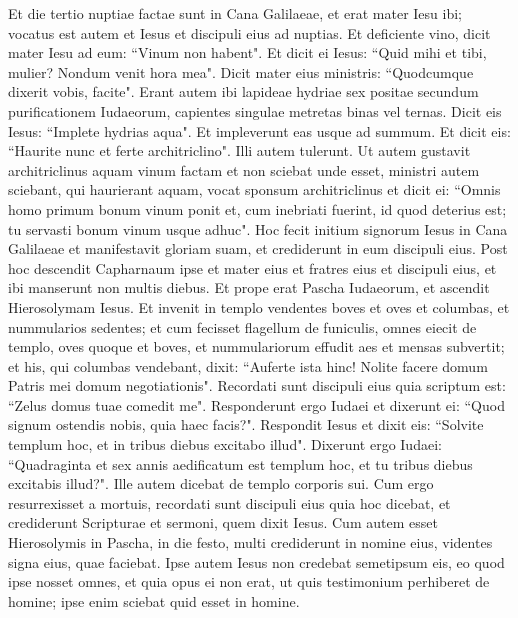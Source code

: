 \begin{biblechapter} 
\verse Et die tertio nuptiae factae sunt in Cana Galilaeae, et erat mater Iesu ibi; 
\verse vocatus est autem et Iesus et discipuli eius ad nuptias. 
\verse Et deficiente vino, dicit mater Iesu ad eum: “Vinum non habent". 
\verse Et dicit ei Iesus: “Quid mihi et tibi, mulier? Nondum venit hora mea". 
\verse Dicit mater eius ministris: “Quodcumque dixerit vobis, facite". 
\verse Erant autem ibi lapideae hydriae sex positae secundum purificationem Iudaeorum, capientes singulae metretas binas vel ternas. 
\verse Dicit eis Iesus: “Implete hydrias aqua". Et impleverunt eas usque ad summum. 
\verse Et dicit eis: “Haurite nunc et ferte architriclino". Illi autem tulerunt. 
\verse Ut autem gustavit architriclinus aquam vinum factam et non sciebat unde esset, ministri autem sciebant, qui haurierant aquam, vocat sponsum architriclinus  
\verse et dicit ei: “Omnis homo primum bonum vinum ponit et, cum inebriati fuerint, id quod deterius est; tu servasti bonum vinum usque adhuc". 
\verse Hoc fecit initium signorum Iesus in Cana Galilaeae et manifestavit gloriam suam, et crediderunt in eum discipuli eius. 
\verse Post hoc descendit Capharnaum ipse et mater eius et fratres eius et discipuli eius, et ibi manserunt non multis diebus. 
\verse Et prope erat Pascha Iudaeorum, et ascendit Hierosolymam Iesus. 
\verse Et invenit in templo vendentes boves et oves et columbas, et nummularios sedentes;  
\verse et cum fecisset flagellum de funiculis, omnes eiecit de templo, oves quoque et boves, et nummulariorum effudit aes et mensas subvertit; 
\verse et his, qui columbas vendebant, dixit: “Auferte ista hinc! Nolite facere domum Patris mei domum negotiationis". 
\verse Recordati sunt discipuli eius quia scriptum est: “Zelus domus tuae comedit me". 
\verse Responderunt ergo Iudaei et dixerunt ei: “Quod signum ostendis nobis, quia haec facis?". 
\verse Respondit Iesus et dixit eis: “Solvite templum hoc, et in tribus diebus excitabo illud". 
\verse Dixerunt ergo Iudaei: “Quadraginta et sex annis aedificatum est templum hoc, et tu tribus diebus excitabis illud?". 
\verse Ille autem dicebat de templo corporis sui. 
\verse Cum ergo resurrexisset a mortuis, recordati sunt discipuli eius quia hoc dicebat, et crediderunt Scripturae et sermoni, quem dixit Iesus. 
\verse Cum autem esset Hierosolymis in Pascha, in die festo, multi crediderunt in nomine eius, videntes signa eius, quae faciebat. 
\verse Ipse autem Iesus non credebat semetipsum eis, eo quod ipse nosset omnes, 
\verse et quia opus ei non erat, ut quis testimonium perhiberet de homine; ipse enim sciebat quid esset in homine. 
\end{biblechapter}

